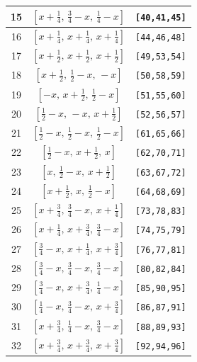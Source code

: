 \documentclass[fleqn,8pt]{jsarticle}
\begin{document}
\begin{longtable}{ccc}
15 & $\left[ x + \frac{1}{4},\, \frac{3}{4} - x,\, \frac{1}{4} - x \right]$ & {\tt [40,41,45]} \\ \hline
16 & $\left[ x + \frac{1}{4},\, x + \frac{1}{4},\, x + \frac{1}{4} \right]$ & {\tt [44,46,48]} \\ \hline
17 & $\left[ x + \frac{1}{2},\, x + \frac{1}{2},\, x + \frac{1}{2} \right]$ & {\tt [49,53,54]} \\ \hline
18 & $\left[ x + \frac{1}{2},\, \frac{1}{2} - x,\, - x \right]$ & {\tt [50,58,59]} \\ \hline
19 & $\left[ - x,\, x + \frac{1}{2},\, \frac{1}{2} - x \right]$ & {\tt [51,55,60]} \\ \hline
20 & $\left[ \frac{1}{2} - x,\, - x,\, x + \frac{1}{2} \right]$ & {\tt [52,56,57]} \\ \hline
21 & $\left[ \frac{1}{2} - x,\, \frac{1}{2} - x,\, \frac{1}{2} - x \right]$ & {\tt [61,65,66]} \\ \hline
22 & $\left[ \frac{1}{2} - x,\, x + \frac{1}{2},\, x \right]$ & {\tt [62,70,71]} \\ \hline
23 & $\left[ x,\, \frac{1}{2} - x,\, x + \frac{1}{2} \right]$ & {\tt [63,67,72]} \\ \hline
24 & $\left[ x + \frac{1}{2},\, x,\, \frac{1}{2} - x \right]$ & {\tt [64,68,69]} \\ \hline
25 & $\left[ x + \frac{3}{4},\, \frac{3}{4} - x,\, x + \frac{1}{4} \right]$ & {\tt [73,78,83]} \\ \hline
26 & $\left[ x + \frac{1}{4},\, x + \frac{3}{4},\, \frac{3}{4} - x \right]$ & {\tt [74,75,79]} \\ \hline
27 & $\left[ \frac{3}{4} - x,\, x + \frac{1}{4},\, x + \frac{3}{4} \right]$ & {\tt [76,77,81]} \\ \hline
28 & $\left[ \frac{3}{4} - x,\, \frac{3}{4} - x,\, \frac{3}{4} - x \right]$ & {\tt [80,82,84]} \\ \hline
29 & $\left[ \frac{3}{4} - x,\, x + \frac{3}{4},\, \frac{1}{4} - x \right]$ & {\tt [85,90,95]} \\ \hline
30 & $\left[ \frac{1}{4} - x,\, \frac{3}{4} - x,\, x + \frac{3}{4} \right]$ & {\tt [86,87,91]} \\ \hline
31 & $\left[ x + \frac{3}{4},\, \frac{1}{4} - x,\, \frac{3}{4} - x \right]$ & {\tt [88,89,93]} \\ \hline
32 & $\left[ x + \frac{3}{4},\, x + \frac{3}{4},\, x + \frac{3}{4} \right]$ & {\tt [92,94,96]} \\
\end{longtable}
\renewcommand{\arraystretch}{1.2}
\end{document}
